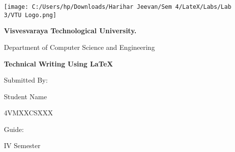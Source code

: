 \documentclass{article}
\begin{document}
	\begin{center}
		\centering
		\texttt{[image: C:/Users/hp/Downloads/Harihar Jeevan/Sem 4/LateX/Labs/Lab 3/VTU Logo.png]}\par
		{\Large\textbf{Visvesvaraya Technological University.}\par}
		\vspace{1cm}
		{\Large{Department of Computer Science and Engineering}\par}
		\vspace{2cm}
		{\Huge\textbf{Technical Writing Using LaTeX}\par}
		\vspace{2cm}
		{\Large{Submitted By:}\par}
		{\large{Student Name}\par}
		{\large{4VMXXCSXXX}\par}
		\vspace{2cm}
		{\Large{Guide:}\par}
		{\large{}\par}
		\vfill
		{\large{IV Semester}\par}
	\end{center}
\end{document}
